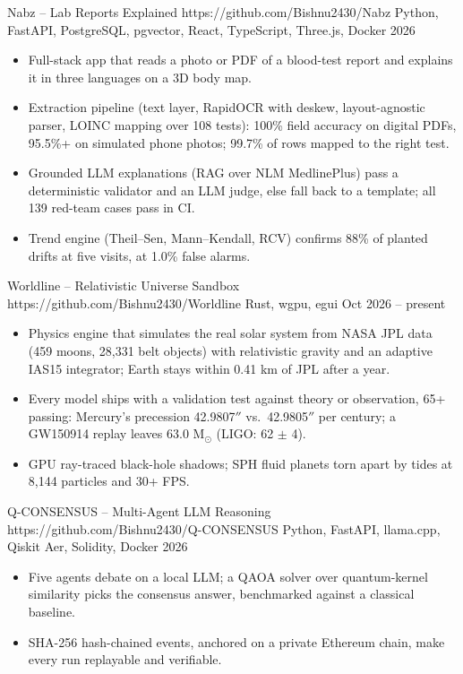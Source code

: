 
\resumeproject
{Nabz -- Lab Reports Explained}
{https://github.com/Bishnu2430/Nabz}
{Python, FastAPI, PostgreSQL, pgvector, React, TypeScript, Three.js, Docker}
{2026}
\begin{itemize}
\item Full-stack app that reads a photo or PDF of a blood-test report and explains it in three languages on a 3D body map.
\item Extraction pipeline (text layer, RapidOCR with deskew, layout-agnostic parser, LOINC mapping over 108 tests): 100\% field accuracy on digital PDFs, 95.5\%+ on simulated phone photos; 99.7\% of rows mapped to the right test.
\item Grounded LLM explanations (RAG over NLM MedlinePlus) pass a deterministic validator and an LLM judge, else fall back to a template; all 139 red-team cases pass in CI.
\item Trend engine (Theil--Sen, Mann--Kendall, RCV) confirms 88\% of planted drifts at five visits, at 1.0\% false alarms.
\end{itemize}

\entrygap

\resumeproject
{Worldline -- Relativistic Universe Sandbox}
{https://github.com/Bishnu2430/Worldline}
{Rust, wgpu, egui}
{Oct 2026 -- present}
\begin{itemize}
\item Physics engine that simulates the real solar system from NASA JPL data (459 moons, 28,331 belt objects) with relativistic gravity and an adaptive IAS15 integrator; Earth stays within 0.41 km of JPL after a year.
\item Every model ships with a validation test against theory or observation, 65+ passing: Mercury's precession 42.9807$''$ vs.\ 42.9805$''$ per century; a GW150914 replay leaves 63.0 M$_\odot$ (LIGO: 62 $\pm$ 4).
\item GPU ray-traced black-hole shadows; SPH fluid planets torn apart by tides at 8,144 particles and 30+ FPS.
\end{itemize}

\entrygap

\resumeproject
{Q-CONSENSUS -- Multi-Agent LLM Reasoning}
{https://github.com/Bishnu2430/Q-CONSENSUS}
{Python, FastAPI, llama.cpp, Qiskit Aer, Solidity, Docker}
{2026}
\begin{itemize}
\item Five agents debate on a local LLM; a QAOA solver over quantum-kernel similarity picks the consensus answer, benchmarked against a classical baseline.
\item SHA-256 hash-chained events, anchored on a private Ethereum chain, make every run replayable and verifiable.
\end{itemize}

